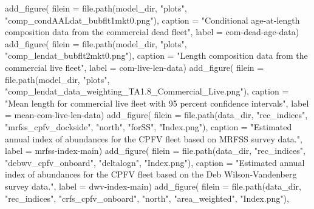 \documentclass[
  letterpaper,
]{article}
\newenvironment{Shaded}{\begin{snugshade}}{\end{snugshade}}
\newcommand{\AttributeTok}[1]{\textcolor[rgb]{0.77,0.63,0.00}{#1}}
\newcommand{\FunctionTok}[1]{\textcolor[rgb]{0.00,0.00,0.00}{#1}}
\newcommand{\NormalTok}[1]{#1}
\newcommand{\StringTok}[1]{\textcolor[rgb]{0.31,0.60,0.02}{#1}}
\begin{document}
\begin{Shaded}
\begin{Highlighting}[]
\FunctionTok{add\_figure}\NormalTok{(}
\AttributeTok{filein =} \FunctionTok{file.path}\NormalTok{(model\_dir, }\StringTok{"plots"}\NormalTok{, }\StringTok{"comp\_condAALdat\_bubflt1mkt0.png"}\NormalTok{), }
\AttributeTok{caption =} \StringTok{"Conditional age{-}at{-}length composition data from the commercial dead fleet"}\NormalTok{,}
\AttributeTok{label =} \StringTok{\textquotesingle{}com{-}dead{-}age{-}data\textquotesingle{}}\NormalTok{)}
\FunctionTok{add\_figure}\NormalTok{(}
\AttributeTok{filein =} \FunctionTok{file.path}\NormalTok{(model\_dir, }\StringTok{"plots"}\NormalTok{, }\StringTok{"comp\_lendat\_bubflt2mkt0.png"}\NormalTok{), }
\AttributeTok{caption =} \StringTok{"Length composition data from the commercial live fleet"}\NormalTok{,}
\AttributeTok{label =} \StringTok{\textquotesingle{}com{-}live{-}len{-}data\textquotesingle{}}\NormalTok{)}
\FunctionTok{add\_figure}\NormalTok{(}
\AttributeTok{filein =} \FunctionTok{file.path}\NormalTok{(model\_dir, }\StringTok{"plots"}\NormalTok{, }\StringTok{"comp\_lendat\_data\_weighting\_TA1.8\_Commercial\_Live.png"}\NormalTok{), }
\AttributeTok{caption =} \StringTok{"Mean length for commercial live fleet with 95 percent confidence intervals"}\NormalTok{,}
\AttributeTok{label =} \StringTok{\textquotesingle{}mean{-}com{-}live{-}len{-}data\textquotesingle{}}\NormalTok{)}
\FunctionTok{add\_figure}\NormalTok{(}
\AttributeTok{filein =} \FunctionTok{file.path}\NormalTok{(data\_dir, }\StringTok{"rec\_indices"}\NormalTok{, }\StringTok{"mrfss\_cpfv\_dockside"}\NormalTok{, }\StringTok{"north"}\NormalTok{,  }\StringTok{"forSS"}\NormalTok{, }\StringTok{"Index.png"}\NormalTok{), }
\AttributeTok{caption =} \StringTok{"Estimated annual index of abundances for the CPFV fleet based on MRFSS survey data."}\NormalTok{,}
\AttributeTok{label =} \StringTok{\textquotesingle{}mrfss{-}index{-}main\textquotesingle{}}\NormalTok{)}
\FunctionTok{add\_figure}\NormalTok{(}
\AttributeTok{filein =} \FunctionTok{file.path}\NormalTok{(data\_dir, }\StringTok{"rec\_indices"}\NormalTok{, }\StringTok{"debwv\_cpfv\_onboard"}\NormalTok{,  }\StringTok{"deltalogn"}\NormalTok{, }\StringTok{"Index.png"}\NormalTok{), }
\AttributeTok{caption =} \StringTok{"Estimated annual index of abundances for the CPFV fleet based on the Deb Wilson{-}Vandenberg survey data."}\NormalTok{,}
\AttributeTok{label =} \StringTok{\textquotesingle{}dwv{-}index{-}main\textquotesingle{}}\NormalTok{)}
\FunctionTok{add\_figure}\NormalTok{(}
\AttributeTok{filein =} \FunctionTok{file.path}\NormalTok{(data\_dir, }\StringTok{"rec\_indices"}\NormalTok{, }\StringTok{"crfs\_cpfv\_onboard"}\NormalTok{, }\StringTok{"north"}\NormalTok{,  }\StringTok{"area\_weighted"}\NormalTok{, }\StringTok{"Index.png"}\NormalTok{), }

\end{Highlighting}
\end{Shaded}
\end{document}
